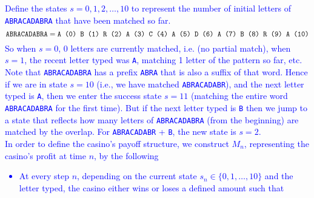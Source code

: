 \documentclass{article}
\begin{document}
\begin{enumerate}
    \textcolor{blue}{
Define the states $s=0,1,2,\ldots,10$ to represent the number of initial letters of \texttt{ABRACADABRA} that have been matched so far. 
\[
\text{\tt ABRACADABRA} = 
\text{\tt A (0) B (1) R (2) A (3) C (4) A (5) D (6) A (7) B (8) R (9) A (10)}
\]
So when $s=0$, 0 letters are currently matched, i.e. (no partial match), when $s=1$, the recent letter typed was \texttt{A}, matching 1 letter of the pattern so far, etc. \\
Note that \texttt{ABRACADABRA} has a prefix \texttt{ABRA} that is also a suffix of that word. 
Hence if we are in state $s=10$ (i.e., we have matched \texttt{ABRACADABR}),
and the next letter typed is \texttt{A}, then we enter the success state $s=11$
(matching the entire word \texttt{ABRACADABRA} for the first
time). But if the next letter typed is \texttt{B}
then we jump to a state that reflects how many
letters of \texttt{ABRACADABRA} (from the beginning) are matched by the
overlap. For \texttt{ABRACADABR} + \texttt{B}, the new state is $s=2$. \\
In order to define the casino's payoff structure, we construct $M_n$, representing the casino's profit at time $n$, by the following \\
\begin{itemize}
\item At every step $n$, depending on the current state $s_n \in \{0,1,\dots,10\}$ and the letter typed, the casino either wins or loses a defined amount such that

\end{itemize}}
\end{enumerate}
\end{document}
